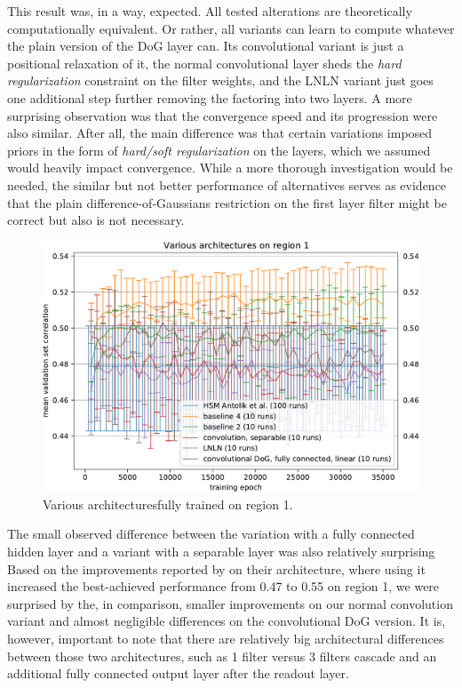 This result was, in a way, expected. All tested alterations are theoretically computationally equivalent. Or rather, all variants can learn to compute whatever the plain version of the DoG layer can. Its convolutional variant is just a positional relaxation of it, the normal convolutional layer sheds the \textit{hard regularization} constraint on the filter weights, and the LNLN variant just goes one additional step further removing the factoring into two layers. A more surprising observation was that the convergence speed and its progression were also similar. After all, the main difference was that certain variations imposed priors in the form of \textit{hard/soft regularization} on the layers, which we assumed would heavily impact convergence. While a more thorough investigation would be needed, the similar but not better performance of alternatives serves as evidence that the plain difference-of-Gaussians restriction on the first layer filter might be correct but also is not necessary.

\begin{figure}[H]
    \centering
    \includegraphics[width=1\textwidth]{../figures/05_3_2_1_1}
    \caption[Various architectures on region 1]{Various architectures\protect\footnotemark fully trained on {region 1}.}
    \label{fig:5.3.2.1_1}
\end{figure}


The small observed difference between the variation with a fully connected hidden layer and a variant with a separable layer was also relatively surprising Based on the improvements reported by \cite{klindt} on their architecture, where using it increased the best-achieved performance from 0.47 to 0.55 on region 1, we were surprised by the, in comparison, smaller improvements on our normal convolution variant and almost negligible differences on the convolutional DoG version. It is, however, important to note that there are relatively big architectural differences between those two architectures, such as 1 filter versus 3 filters cascade and an additional fully connected output layer after the readout layer.


